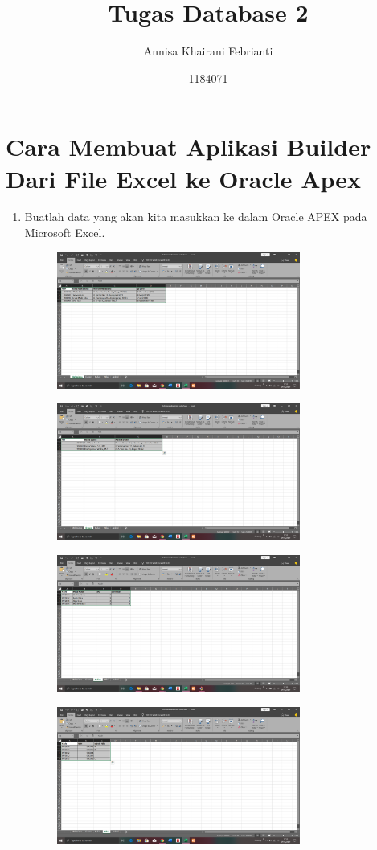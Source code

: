 \documentclass{article}
\title{Tugas Database 2}
\author{Annisa Khairani Febrianti}
\date{1184071}
\begin{document}
\maketitle
\section{Cara Membuat Aplikasi Builder Dari File Excel ke Oracle Apex}
\begin{enumerate}
    \item Buatlah data yang akan kita masukkan ke dalam Oracle APEX pada Microsoft Excel.
\begin{figure} [h]
\centerline{\includegraphics[width=8cm]{figure/54.png}}
\end{figure}
\newpage \begin{figure} [h]
\centerline{\includegraphics[width=8cm]{figure/55.png}}
\end{figure}
\begin{figure} [h]
\centerline{\includegraphics[width=8cm]{figure/59.png}}
\end{figure}
\begin{figure} [h]
\centerline{\includegraphics[width=8cm]{figure/57.png}}

\end{figure}
\end{enumerate}
\end{document}
